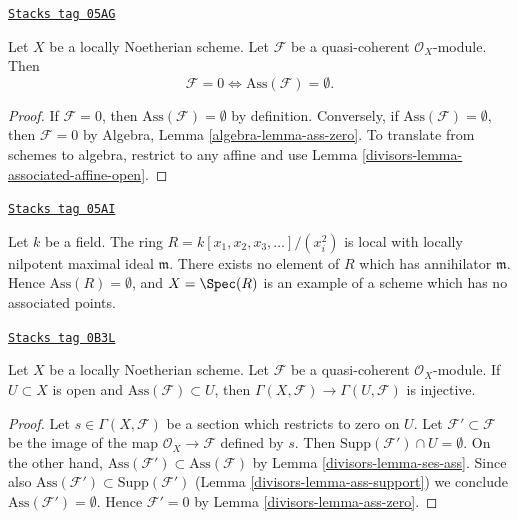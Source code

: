 \begin{lemma}
\label{divisors-lemma-ass-zero}
\href{https://stacks.math.columbia.edu/tag/05AG}{\texttt{Stacks tag 05AG}}

Let $X$ be a locally Noetherian scheme. Let $\mathcal{F}$ be a
quasi-coherent $\mathcal{O}_X$-module. Then
$$
\mathcal{F} = 0 \Leftrightarrow \text{Ass}(\mathcal{F}) = \emptyset.
$$
\end{lemma}

\begin{proof}

If $\mathcal{F} = 0$, then $\text{Ass}(\mathcal{F}) = \emptyset$
by definition. Conversely, if $\text{Ass}(\mathcal{F}) = \emptyset$,
then $\mathcal{F} = 0$ by
Algebra, Lemma \ref{algebra-lemma-ass-zero}.
To translate from schemes to algebra, restrict to any affine and use
Lemma \ref{divisors-lemma-associated-affine-open}.
\end{proof}

\begin{example}
\label{divisors-example-no-associated-prime}
\href{https://stacks.math.columbia.edu/tag/05AI}{\texttt{Stacks tag 05AI}}

Let $k$ be a field. The ring $R = k[x_1, x_2, x_3, \ldots]/(x_i^2)$
is local with locally nilpotent maximal ideal $\mathfrak m$.
There exists no element of $R$ which has annihilator $\mathfrak m$.
Hence $\text{Ass}(R) = \emptyset$, and $X = \Spec(R)$
is an example of a scheme which has no associated points.
\end{example}

\begin{lemma}
\label{divisors-lemma-restriction-injective-open-contains-ass}
\href{https://stacks.math.columbia.edu/tag/0B3L}{\texttt{Stacks tag 0B3L}}

Let $X$ be a locally Noetherian scheme. Let $\mathcal{F}$ be a quasi-coherent
$\mathcal{O}_X$-module. If $U \subset X$ is open and
$\text{Ass}(\mathcal{F}) \subset U$, then
$\Gamma(X, \mathcal{F}) \to \Gamma(U, \mathcal{F})$ is injective.
\end{lemma}

\begin{proof}

Let $s \in \Gamma(X, \mathcal{F})$ be a section which restricts to zero on $U$.
Let $\mathcal{F}' \subset \mathcal{F}$ be the image of the map
$\mathcal{O}_X \to \mathcal{F}$ defined by $s$. Then
$\text{Supp}(\mathcal{F}') \cap U = \emptyset$. On the other hand,
$\text{Ass}(\mathcal{F}') \subset \text{Ass}(\mathcal{F})$
by Lemma \ref{divisors-lemma-ses-ass}. Since also
$\text{Ass}(\mathcal{F}') \subset \text{Supp}(\mathcal{F}')$
(Lemma \ref{divisors-lemma-ass-support}) we conclude
$\text{Ass}(\mathcal{F}') = \emptyset$.
Hence $\mathcal{F}' = 0$ by Lemma \ref{divisors-lemma-ass-zero}.
\end{proof}

